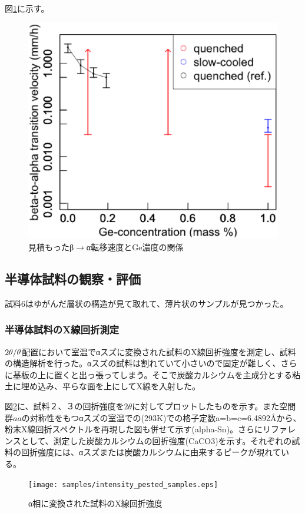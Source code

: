 図\ref{fig:Transtionvelocity_beta_to_alpha}に示す。
\begin{figure}[!h]
    \begin{center}
   \includegraphics[width=0.6\hsize]{samples/Transtionvelocity_beta_to_alpha.eps}
  \end{center}
  \caption{見積もったβ$\to$α転移速度とGe濃度の関係}
  \label{fig:Transtionvelocity_beta_to_alpha}
\end{figure}



\subsection{半導体試料の観察・評価}
試料6はゆがんだ層状の構造が見て取れて、薄片状のサンプルが見つかった。

\subsubsection{半導体試料のX線回折測定}
$\rm 2\theta/\theta$配置において室温でαスズに変換された試料のX線回折強度を測定し、試料の構造解析を行った。αスズの試料は割れていて小さいので固定が難しく、さらに基板の上に置くと出っ張ってしまう。そこで炭酸カルシウムを主成分とする粘土に埋め込み、平らな面を上にしてX線を入射した。

図\ref{fig:intensity_pested_samples}に、試料２、３の回折強度を$2\theta$に対してプロットしたものを示す。また空間群$aa$の対称性をもつαスズの室温での(293K)での格子定数a=b=c=6.4892\AA \cite{THEWLIS}から、粉末X線回折スペクトルを再現した図も併せて示す(alpha-Sn)。さらにリファレンスとして、測定した炭酸カルシウムの回折強度(CaCO3)を示す。それぞれの試料の回折強度には、αスズまたは炭酸カルシウムに由来するピークが現れている。
\begin{figure}[!h]
  \begin{center}
  \texttt{[image: samples/intensity\_pested\_samples.eps]}
  \end{center}
  \caption{α相に変換された試料のX線回折強度}
  \label{fig:intensity_pested_samples}
\end{figure}

